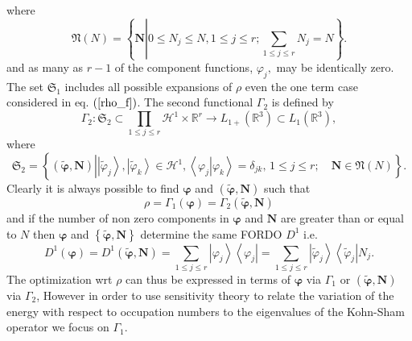 \documentclass[aps,preprint]{revtex4}%
\begin{document}
where
\begin{equation}
\mathfrak{N}\left(  N\right)  =\left\{  \boldsymbol{N}\left\vert 0\leq
N_{j}\leq N,1\leq j\leq r;\sum_{1\leq j\leq r}N_{j}=N\right.  \right\}  .
\end{equation}
and as many as $r-1$ of the component functions, $\varphi_{j},$ may be
identically zero. The set $\mathfrak{S}_{1}$ includes all possible expansions
of $\rho$ even the one term case considered in eq. $\left(  \ref{rho_f}%
\right)  $. The second functional $\Gamma_{2}$ is defined by
\begin{equation}
\Gamma_{2}:\mathfrak{S}_{2}\subset\prod\limits_{1\leq j\leq r}\mathcal{H}%
^{1}\times\mathbb{R}^{r}\rightarrow L_{1+}\left(  \mathbb{R}^{3}\right)
\subset L_{1}\left(  \mathbb{R}^{3}\right)  ,
\end{equation}
where
\begin{equation}
\mathfrak{S}_{2}=\left\{  \left(  \boldsymbol{\tilde{\varphi},N}\right)
\left\vert \left\vert \tilde{\varphi}_{j}\right\rangle ,\left\vert
\tilde{\varphi}_{k}\right\rangle \in\mathcal{H}^{1},\left\langle \left.
\varphi_{j}\right\vert \varphi_{k}\right\rangle =\delta_{jk},\,1\leq j\leq
r;\quad\boldsymbol{N}\in\mathfrak{N}\left(  N\right)  \right.  \right\}  .
\label{set2}%
\end{equation}
Clearly it is always possible to find $\boldsymbol{\varphi}$ and $\left(
\boldsymbol{\tilde{\varphi},N}\right)  $ such that
\begin{equation}
\rho=\Gamma_{1}\left(  \boldsymbol{\varphi}\right)  =\Gamma_{2}\left(
\boldsymbol{\tilde{\varphi},N}\right)
\end{equation}
and if the number of non zero components in $\boldsymbol{\varphi}$ and
$\boldsymbol{N}$ are greater than or equal to $N$ then $\boldsymbol{\varphi}$
and $\left\{  \boldsymbol{\tilde{\varphi},N}\right\}  $ determine the same
FORDO $D^{1}$ i.e.
\begin{equation}
D^{1}\left(  \boldsymbol{\varphi}\right)  =D^{1}\left(  \boldsymbol{\tilde
{\varphi},N}\right)  =\sum_{1\leq j\leq r}\left\vert \varphi_{j}\right\rangle
\left\langle \varphi_{j}\right\vert =\sum_{1\leq j\leq r}\left\vert
\tilde{\varphi}_{j}\right\rangle \left\langle \tilde{\varphi}_{j}\right\vert
N_{j}.
\end{equation}
The optimization wrt $\rho$ can thus be expressed in terms of
$\boldsymbol{\varphi}$ via $\Gamma_{1}$ or $\left(  \boldsymbol{\tilde
{\varphi},N}\right)  $ via $\Gamma_{2}$, However in order to use sensitivity
theory to relate the variation of the energy with respect to occupation
numbers to the eigenvalues of the Kohn-Sham operator we focus on $\Gamma_{1}.$
\end{document}
